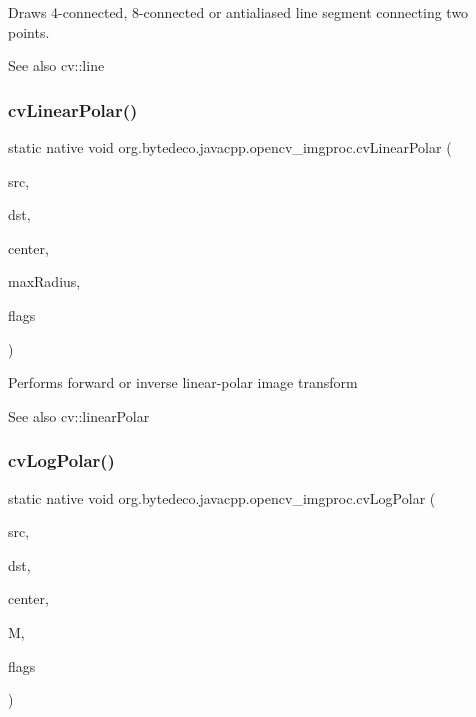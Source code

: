 Draws 4-\/connected, 8-\/connected or antialiased line segment connecting two points. 

\begin{DoxySeeAlso}{See also}
cv\+::line 
\end{DoxySeeAlso}
\mbox{\label{group__imgproc__c_gaea7618f99d98e843a4bd01f403a4995e}} 
\subsubsection{\texorpdfstring{cv\+Linear\+Polar()}{cvLinearPolar()}}
{\footnotesize\ttfamily static native void org.\+bytedeco.\+javacpp.\+opencv\+\_\+imgproc.\+cv\+Linear\+Polar (\begin{DoxyParamCaption}\item[{@Const Cv\+Arr}]{src,  }\item[{Cv\+Arr}]{dst,  }\item[{@By\+Val Cv\+Point2\+D32f}]{center,  }\item[{double}]{max\+Radius,  }\item[{int}]{flags }\end{DoxyParamCaption})\hspace{0.3cm}{\ttfamily [static]}}

Performs forward or inverse linear-\/polar image transform \begin{DoxySeeAlso}{See also}
cv\+::linear\+Polar 
\end{DoxySeeAlso}
\mbox{\label{group__imgproc__c_gaa181829e06fd0d2f59e112e2a5e27129}} 
\subsubsection{\texorpdfstring{cv\+Log\+Polar()}{cvLogPolar()}}
{\footnotesize\ttfamily static native void org.\+bytedeco.\+javacpp.\+opencv\+\_\+imgproc.\+cv\+Log\+Polar (\begin{DoxyParamCaption}\item[{@Const Cv\+Arr}]{src,  }\item[{Cv\+Arr}]{dst,  }\item[{@By\+Val Cv\+Point2\+D32f}]{center,  }\item[{double}]{M,  }\item[{int}]{flags }\end{DoxyParamCaption})\hspace{0.3cm}{\ttfamily [static]}}




